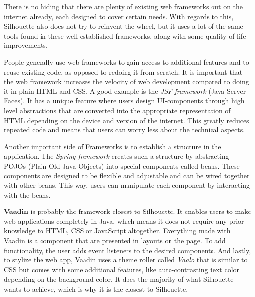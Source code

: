 \documentclass[12pt]{article}
\begin{document}
There is no hiding that there are plenty of existing web frameworks out on the internet already, each designed to cover certain needs. With regards to this, Silhouette also does not try to reinvent the wheel, but it uses a lot of the same tools found in these well established frameworks, along with some quality of life improvements.

People generally use web frameworks to gain access to additional features and to reuse existing code, as opposed to redoing it from scratch. It is important that the web framework increases the velocity of web development compared to doing it in plain HTML and CSS. A good example is the \textit{JSF framework} (Java Server Faces). It has a unique feature where users design UI-components through high level abstractions that are converted into the appropriate representation of HTML depending on the device and version of the internet. This greatly reduces repeated code and means that users can worry less about the technical aspects.

Another important side of Frameworks is to establish a structure in the application. The \textit{Spring framework} creates such a structure by abstracting POJOs (Plain Old Java Objects) into special components called beans. These components are designed to be flexible and adjustable and can be wired together with other beans. This way, users can manipulate each component by interacting with the beans. 

\textbf{Vaadin} is probably the framework closest to Silhouette. It enables users to make web applications completely in Java, which means it does not require any prior knowledge to HTML, CSS or JavaScript altogether. Everything made with Vaadin is a component that are presented in layouts on the page. To add functionality, the user adds event listeners to the desired components. And lastly, to stylize the web app, Vaadin uses a theme roller called \textit{Vaalo} that is similar to CSS but comes with some additional features, like auto-contrasting text color depending on the background color. It does the majority of what Silhouette wants to achieve, which is why it is the closest to Silhouette.
\end{document}
